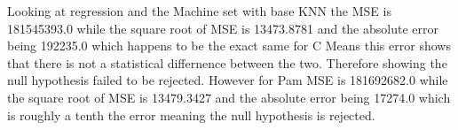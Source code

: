 \documentclass[twoside,11pt]{article}
\begin{document}
Looking at regression and the Machine set with base KNN the MSE is 181545393.0 while the square root of MSE is 13473.8781
and the absolute error being 192235.0 which happens to be the exact same for C Means this error shows that there is not a statistical differnence
between the two.  Therefore showing the null hypothesis failed to be rejected. However for Pam MSE is 181692682.0 while the square root of 
MSE is 13479.3427 and the absolute error being 17274.0 which is roughly a tenth the error meaning the null hypothesis is rejected.






\newpage





\vskip 0.2in

\end{document}
